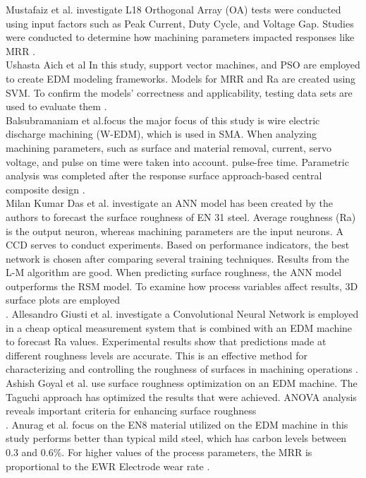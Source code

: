 \cite{ahmad2016optimization}Mustafaiz et al. investigate L18 Orthogonal Array (OA) tests were conducted using input factors such as Peak Current, Duty Cycle, and Voltage Gap. Studies were conducted to determine how machining parameters impacted responses like MRR . \\

\cite{aich2014modeling}Ushasta Aich et al In this study, support vector machines, and PSO are employed to create EDM modeling frameworks. Models for MRR and Ra are created using SVM. To confirm the models' correctness and applicability, testing data sets are used to evaluate them .\\

\cite{balasubramaniyan2021wire}Balsubramaniam et al.focus the major focus of this study is wire electric discharge machining (W-EDM), which is used in SMA. When analyzing machining parameters, such as surface and material removal, current, servo voltage, and pulse on time were taken into account. pulse-free time. Parametric analysis was completed after the response surface approach-based central composite design .\\
\cite{das2014prediction}Milan Kumar Das et al. \cite{} investigate an ANN model has been created by the authors to forecast the surface roughness of EN 31 steel. Average roughness (Ra) is the output neuron, whereas machining parameters are the input neurons. A CCD serves to conduct experiments. Based on performance indicators, the best network is chosen after comparing several training techniques. Results from the L-M algorithm are good. When predicting surface roughness, the ANN model outperforms the RSM model. To examine how process variables affect results, 3D surface plots are employed\\ .
\cite{giusti2020image}Allesandro Giusti et al. investigate a Convolutional Neural Network is employed in a cheap optical measurement system that is combined with an EDM machine to forecast Ra values. Experimental results show that predictions made at different roughness levels are accurate. This is an effective method for characterizing and controlling the roughness of surfaces in machining operations .\\
\cite{goyal2021optimization}Ashish Goyal et al. use surface roughness optimization on an EDM machine. The Taguchi approach has optimized the results that were achieved. ANOVA analysis reveals important criteria for enhancing surface roughness \\.
\cite{joshi2020edm}Anurag et al. focus on the EN8 material utilized on the EDM machine in this study performs better than typical mild steel, which has carbon levels between 0.3 and 0.6\%. For higher values of the process parameters, the MRR is proportional to the EWR Electrode wear rate .\\
